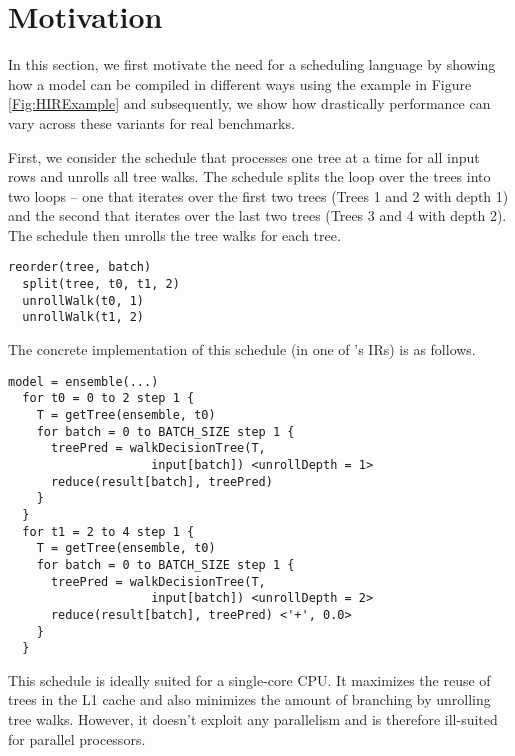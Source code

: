 \section{Motivation}

In this section, we first motivate the need for a scheduling language 
by showing how a model can be compiled in different ways using the example
in Figure \ref{Fig:HIRExample} and subsequently, we show how drastically 
performance can vary across these variants for real benchmarks.

First, we consider the schedule that processes one tree at a time 
for all input rows and unrolls all tree walks. 
The schedule splits the loop over the trees into two loops -- one that
iterates over the first two trees (Trees 1 and 2 with depth 1) and 
the second that iterates over the last two trees (Trees 3 and 4 with
depth 2). The schedule then unrolls the tree walks for each tree.
\begin{lstlisting}[style=c++]
  reorder(tree, batch)  
  split(tree, t0, t1, 2)
  unrollWalk(t0, 1)
  unrollWalk(t1, 2)
\end{lstlisting}
The concrete implementation of this schedule (in one of \Treebeard{}'s IRs) 
is as follows.
\begin{lstlisting}[style=c++]
  model = ensemble(...)
  for t0 = 0 to 2 step 1 {
    T = getTree(ensemble, t0)
    for batch = 0 to BATCH_SIZE step 1 {
      treePred = walkDecisionTree(T, 
                    input[batch]) <unrollDepth = 1>
      reduce(result[batch], treePred)
    }
  }
  for t1 = 2 to 4 step 1 {
    T = getTree(ensemble, t0)
    for batch = 0 to BATCH_SIZE step 1 {
      treePred = walkDecisionTree(T,
                    input[batch]) <unrollDepth = 2>
      reduce(result[batch], treePred) <'+', 0.0>
    }
  }
\end{lstlisting}
This schedule is ideally suited for a single-core CPU. It maximizes 
the reuse of trees in the L1 cache and also minimizes the amount of
branching by unrolling tree walks. However, it doesn't exploit  
any parallelism and is therefore ill-suited for parallel processors.

